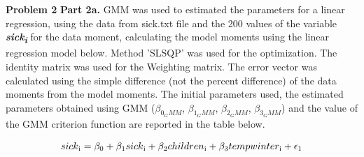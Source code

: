 \documentclass[letterpaper,12pt]{article}
\theoremstyle{definition}
\begin{document}
\noindent\newline\textbf{Problem 2}
\noindent\newline\textbf{Part 2a.} GMM was used to estimated the parameters for a linear regression, using the data from sick.txt file and the 200 values of the variable \textbf{\textit{sick\textsubscript{i}}} for the data moment, calculating the model moments using the linear regression model below. Method 'SLSQP' was used for the optimization. The identity matrix was used for the Weighting matrix. The error vector was calculated using the simple difference (not the percent difference) of the data moments from the model moments. The initial parameters used, the estimated parameters obtained using GMM ($\beta_{0_GMM}$, $\beta_{1_GMM}$, $\beta_{2_GMM}$, $\beta_{3_GMM}$) and the value of the GMM criterion function are reported in the table below. 

\begin{equation}
sick\textsubscript{i} = \beta_{0} + \beta_{1}sick\textsubscript{i} + \beta_{2}children\textsubscript{i}  + \beta_{3}tempwinter\textsubscript{i} + \epsilon_{1}
\end{equation}

\begin{center}
\end{center}
\end{document}
